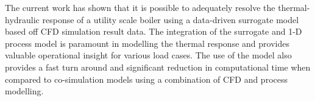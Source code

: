 \documentclass[a4paper,fleqn]{cas-dc}
\begin{document}
The current work has shown that it is possible to adequately resolve the thermal-hydraulic response of a utility scale boiler using a data-driven surrogate model based off CFD simulation result data. The integration of the surrogate and 1-D process model is paramount in modelling the thermal response and provides valuable operational insight for various load cases. The use of the model also provides a fast turn around and significant reduction in computational time when compared to co-simulation models using a combination of CFD and process modelling.
\printcredits

%


\end{document}
